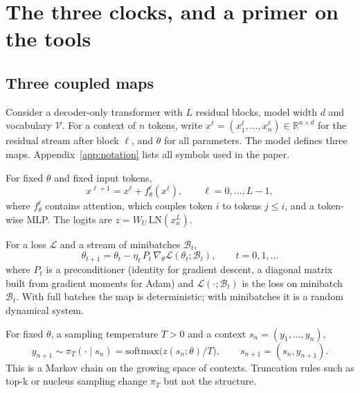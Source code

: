 \section{The three clocks, and a primer on the tools}
\label{sec:primer}

\subsection{Three coupled maps}
\label{sec:maps}

Consider a decoder-only transformer \citep{vaswani2017attention} with $L$ residual blocks, model width $d$ and vocabulary $\mathcal{V}$. For a context of $n$ tokens, write $x^{\ell}=(x^{\ell}_1,\dots,x^{\ell}_n)\in\mathbb{R}^{n\times d}$ for the residual stream after block $\ell$, and $\theta$ for all parameters. The model defines three maps. Appendix~\ref{app:notation} lists all symbols used in the paper.

\begin{definition}
\label{def:clock1}
For fixed $\theta$ and fixed input tokens,
\begin{equation}
x^{\ell+1} = x^{\ell} + f^{\ell}_{\theta}(x^{\ell}), \qquad \ell = 0,\dots,L-1,
\label{eq:clock1}
\end{equation}
where $f^{\ell}_\theta$ contains attention, which couples token $i$ to tokens $j\le i$, and a token-wise MLP. The logits are $z = W_U\, \mathrm{LN}(x^{L}_n)$.
\end{definition}

\begin{definition}
\label{def:clock2}
For a loss $\mathcal{L}$ and a stream of minibatches $\mathcal{B}_t$,
\begin{equation}
\theta_{t+1} = \theta_t - \eta_t\, P_t\, \nabla_\theta \mathcal{L}(\theta_t;\mathcal{B}_t), \qquad t = 0,1,\dots
\label{eq:clock2}
\end{equation}
where $P_t$ is a preconditioner (identity for gradient descent, a diagonal matrix built from gradient moments for Adam) and $\mathcal{L}(\cdot;\mathcal{B}_t)$ is the loss on minibatch $\mathcal{B}_t$. With full batches the map is deterministic; with minibatches it is a random dynamical system.
\end{definition}

\begin{definition}
\label{def:clock3}
For fixed $\theta$, a sampling temperature $T>0$ and a context $s_n=(y_1,\dots,y_n)$,
\begin{equation}
y_{n+1}\sim \pi_T(\cdot\mid s_n) = \mathrm{softmax}\big(z(s_n;\theta)/T\big), \qquad s_{n+1} = (s_n, y_{n+1}).
\label{eq:clock3}
\end{equation}
This is a Markov chain on the growing space of contexts. Truncation rules such as top-k or nucleus sampling change $\pi_T$ but not the structure.
\end{definition}

